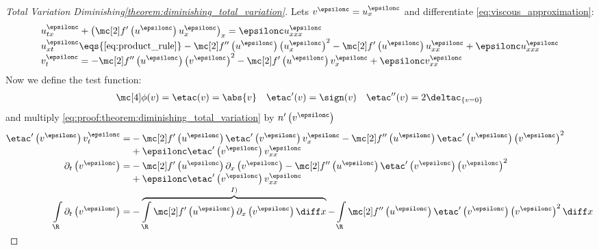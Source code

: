 \begin{proofbox}\nospacing
    \begin{proof}[Total Variation Diminishing\cref{theorem:diminishing_total_variation}]\label{proof:theorem:diminishing_total_variation}
        Lets $v^{\epsilonc}=u_{x}^{\epsilonc}$ and differentiate \cref{eq:viscous_approximation}:
        \begin{align}
          &u_{tx}^{\epsilonc}+\left(\flux' \left(u^{\epsilonc}\right)u_{x}^{\epsilonc}\right)_{x}=\epsilonc u_{xxx}^{\epsilonc}\nonumber\\[-1\jot]
          &u_{xt}^{\epsilonc}\eqs{\cref{eq:product_rule}}
            -\flux''\left(u^{\epsilonc}\right)\left(u_{x}^{\epsilonc}\right)^{2}-\flux'\left(u^{\epsilonc}\right)u_{xx}^{\epsilonc}
            +\epsilonc u_{xxx}^{\epsilonc}\nonumber\\[-1\jot]
          &v_{t}^{\epsilonc}=
            -\flux''\left(u^{\epsilonc}\right)\left(v^{\epsilonc}\right)^{2}-\flux'\left(u^{\epsilonc}\right)v_{x}^{\epsilonc}
            +\epsilonc v_{xx}^{\epsilonc}\label{eq:proof:theorem:diminishing_total_variation}
        \end{align}
        Now we define the test function:
        \begin{align*}
          \testfunc(v)=\etac(v)=\abs{v}&&\etac'(v)=\sign(v)&&\etac''(v)=2\deltac_{\{v=0\}}
        \end{align*}
        and multiply \cref{eq:proof:theorem:diminishing_total_variation} by $n'\left(v^{\epsilonc}\right)$
        \begin{align*}
          \etac'\left(v^{\epsilonc}\right) v_{t}^{\epsilonc}=&
            -\flux'\left(u^{\epsilonc}\right)\etac'\left(v^{\epsilonc}\right)v_{x}^{\epsilonc}-\flux''\left(u^{\epsilonc}\right)\etac'\left(v^{\epsilonc}\right)\left(v^{\epsilonc}\right)^{2}\\[-1\jot]
            &+\epsilonc\etac'\left(v^{\epsilonc}\right)v_{xx}^{\epsilonc}\\[-1\jot]
          \partial_{t}\left(v^{\epsilonc}\right)=&
            -\flux'\left(u^{\epsilonc}\right)\partial_{x}\left(v^{\epsilonc}\right)-\flux''\left(u^{\epsilonc}\right)\etac'\left(v^{\epsilonc}\right)\left(v^{\epsilonc}\right)^{2}\\[-1\jot]
            &+\epsilonc\etac'\left(v^{\epsilonc}\right)v_{xx}^{\epsilonc}\\[-1\jot]
          \int\limits_{\R}\partial_{t}\left(v^{\epsilonc}\right)=&
            -\overbrace{\int\limits_{\R}\flux'\left(u^{\epsilonc}\right)\partial_{x}\left(v^{\epsilonc}\right)\diff x}^{I)}-\int\limits_{\R}\flux''\left(u^{\epsilonc}\right)\etac'\left(v^{\epsilonc}\right)\left(v^{\epsilonc}\right)^{2}\diff x\\[-1\jot]

\end{align*}
\end{proof}
\end{proofbox}
